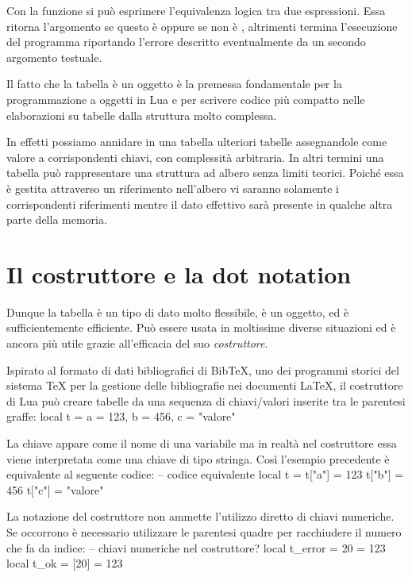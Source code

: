 Con la funzione  si può esprimere l'equivalenza logica tra due
espressioni. Essa ritorna l'argomento se questo è  oppure se non è
, altrimenti termina l'esecuzione del programma riportando l'errore
descritto eventualmente da un secondo argomento testuale.

Il fatto che la tabella è un oggetto è la premessa fondamentale per la
programmazione a oggetti in Lua e per scrivere codice più compatto nelle
elaborazioni su tabelle dalla struttura molto complessa.

In effetti possiamo annidare in una tabella ulteriori tabelle assegnandole come
valore a corrispondenti chiavi, con complessità arbitraria. In altri termini
una tabella può rappresentare una struttura ad albero senza limiti teorici.
Poiché essa è gestita attraverso un riferimento nell'albero vi saranno solamente
i corrispondenti riferimenti mentre il dato effettivo sarà presente in qualche
altra parte della memoria.


\section{Il costruttore e la dot notation}

Dunque la tabella è un tipo di dato molto flessibile, è un oggetto, ed è
sufficientemente efficiente. Può essere usata in moltissime diverse situazioni
ed è ancora più utile grazie all'efficacia del suo \emph{costruttore}.

Ispirato al formato di dati bibliografici di BibTeX, uno dei programmi storici
del sistema \TeX{} per la gestione delle bibliografie nei documenti \LaTeX, il
costruttore di Lua può creare tabelle da una sequenza di chiavi/valori inserite
tra le parentesi graffe:
\lines
local t = { a = 123, b = 456, c = "valore"}
\endlines
{}

La chiave appare come il nome di una variabile ma in realtà nel costruttore
essa viene interpretata come una chiave di tipo stringa. Così l'esempio
precedente è equivalente al seguente codice:
\lines
-- codice equivalente
local t = {}
t["a"] = 123
t["b"] = 456
t["c"] = "valore"
\endlines
{}

La notazione del costruttore non ammette l'utilizzo diretto di chiavi
numeriche. Se occorrono è necessario utilizzare le parentesi quadre per
racchiudere il numero che fa da indice:
\lines
-- chiavi numeriche nel costruttore?
local t_error = { 20 = 123 }
local t_ok = { [20] = 123 }
\endlines
{}

